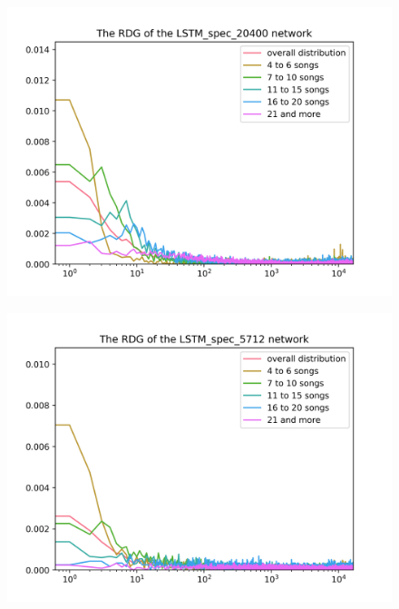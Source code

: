 \begin{figure}[h]
\centering
\begin{minipage}{.5\textwidth}
  \centering
  \includegraphics[width=1\linewidth]{./img/lstm_spec_20400_graph.png}
  \label{fig:lstm_spec_20400_distribution}
\end{minipage}%
\begin{minipage}{.5\textwidth}
  \centering
  \includegraphics[width=1\linewidth]{./img/lstm_spec_5712_graph.png}
  \label{fig:lstm_spec_5712_distribution}
\end{minipage}
\end{figure}\label{fig:lstm_spec_distributions}

